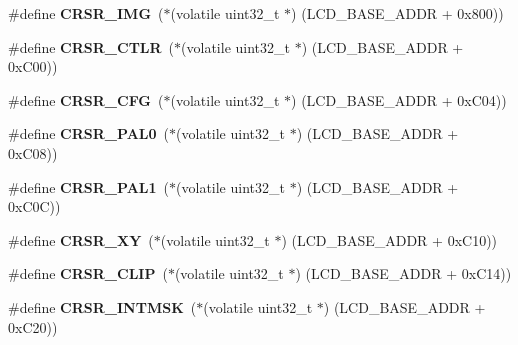 \begin{DoxyCompactItemize}
\#define {\bfseries C\+R\+S\+R\+\_\+\+I\+MG}~($\ast$(volatile uint32\+\_\+t $\ast$) (L\+C\+D\+\_\+\+B\+A\+S\+E\+\_\+\+A\+D\+DR + 0x800))
\item 
\mbox{\label{group__lpc24xx__regs_gac5e238de3c54029841b530c5e60886c2}} 
\#define {\bfseries C\+R\+S\+R\+\_\+\+C\+T\+LR}~($\ast$(volatile uint32\+\_\+t $\ast$) (L\+C\+D\+\_\+\+B\+A\+S\+E\+\_\+\+A\+D\+DR + 0x\+C00))
\item 
\mbox{\label{group__lpc24xx__regs_ga4246efcb909a4eceff79de41dc7377dc}} 
\#define {\bfseries C\+R\+S\+R\+\_\+\+C\+FG}~($\ast$(volatile uint32\+\_\+t $\ast$) (L\+C\+D\+\_\+\+B\+A\+S\+E\+\_\+\+A\+D\+DR + 0x\+C04))
\item 
\mbox{\label{group__lpc24xx__regs_ga5eba708cc5beb203142b228f0e6e2f30}} 
\#define {\bfseries C\+R\+S\+R\+\_\+\+P\+A\+L0}~($\ast$(volatile uint32\+\_\+t $\ast$) (L\+C\+D\+\_\+\+B\+A\+S\+E\+\_\+\+A\+D\+DR + 0x\+C08))
\item 
\mbox{\label{group__lpc24xx__regs_gad998b251f9ac87379aa74985cdcf1708}} 
\#define {\bfseries C\+R\+S\+R\+\_\+\+P\+A\+L1}~($\ast$(volatile uint32\+\_\+t $\ast$) (L\+C\+D\+\_\+\+B\+A\+S\+E\+\_\+\+A\+D\+DR + 0x\+C0\+C))
\item 
\mbox{\label{group__lpc24xx__regs_gaaff9ca2ff448a9549999650051ba071f}} 
\#define {\bfseries C\+R\+S\+R\+\_\+\+XY}~($\ast$(volatile uint32\+\_\+t $\ast$) (L\+C\+D\+\_\+\+B\+A\+S\+E\+\_\+\+A\+D\+DR + 0x\+C10))
\item 
\mbox{\label{group__lpc24xx__regs_ga3423669486477d36ac3f430eb535ca83}} 
\#define {\bfseries C\+R\+S\+R\+\_\+\+C\+L\+IP}~($\ast$(volatile uint32\+\_\+t $\ast$) (L\+C\+D\+\_\+\+B\+A\+S\+E\+\_\+\+A\+D\+DR + 0x\+C14))
\item 
\mbox{\label{group__lpc24xx__regs_gad2bb29b9b0fb68f95f28be5ec5588c60}} 
\#define {\bfseries C\+R\+S\+R\+\_\+\+I\+N\+T\+M\+SK}~($\ast$(volatile uint32\+\_\+t $\ast$) (L\+C\+D\+\_\+\+B\+A\+S\+E\+\_\+\+A\+D\+DR + 0x\+C20))
\item 
\mbox{\label{group__lpc24xx__regs_gae2766baa7af75b6f1ee674702953a6ce}} 

\end{DoxyCompactItemize}
